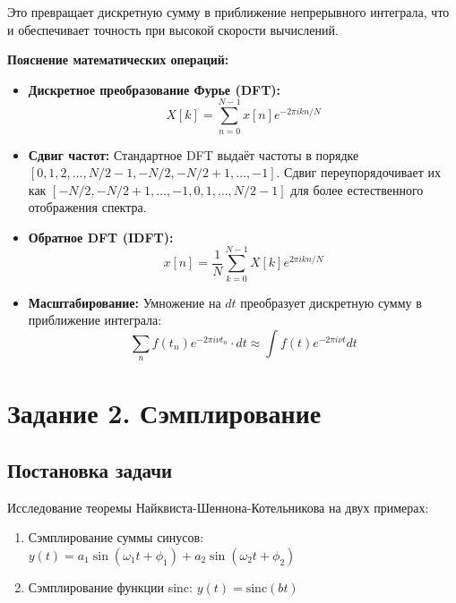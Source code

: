 Это превращает дискретную сумму в приближение непрерывного интеграла, что и обеспечивает точность при высокой скорости вычислений.

\textbf{Пояснение математических операций:}

\begin{itemize}
    \item \textbf{Дискретное преобразование Фурье (DFT):}
    \begin{equation}
    X[k] = \sum_{n=0}^{N-1} x[n] e^{-2\pi i kn/N}
    \end{equation}
    
    \item \textbf{Сдвиг частот:} Стандартное DFT выдаёт частоты в порядке $[0, 1, 2, \ldots, N/2-1, -N/2, -N/2+1, \ldots, -1]$. Сдвиг переупорядочивает их как $[-N/2, -N/2+1, \ldots, -1, 0, 1, \ldots, N/2-1]$ для более естественного отображения спектра.
    
    \item \textbf{Обратное DFT (IDFT):}
    \begin{equation}
    x[n] = \frac{1}{N} \sum_{k=0}^{N-1} X[k] e^{2\pi i kn/N}
    \end{equation}
    
    \item \textbf{Масштабирование:} Умножение на $dt$ преобразует дискретную сумму в приближение интеграла:
    \begin{equation}
    \sum_{n} f(t_n) e^{-2\pi i \nu t_n} \cdot dt \approx \int f(t) e^{-2\pi i \nu t} dt
    \end{equation}
\end{itemize}

\section*{Задание 2. Сэмплирование}

\subsection*{Постановка задачи}

Исследование теоремы Найквиста-Шеннона-Котельникова на двух примерах:
\begin{enumerate}
    \item Сэмплирование суммы синусов: $y(t) = a_1\sin(\omega_1 t + \phi_1) + a_2\sin(\omega_2 t + \phi_2)$
    \item Сэмплирование функции sinc: $y(t) = \text{sinc}(bt)$
\end{enumerate}

